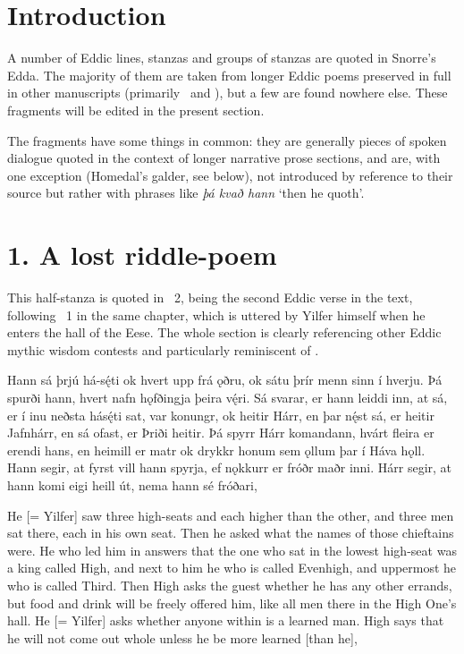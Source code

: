 
\section{Introduction}

A number of Eddic lines, stanzas and groups of stanzas are quoted in Snorre’s Edda.  The majority of them are taken from longer Eddic poems preserved in full in other manuscripts (primarily \Regius\ and \AM), but a few are found nowhere else.  These fragments will be edited in the present section.

The fragments have some things in common: they are generally pieces of spoken dialogue quoted in the context of longer narrative prose sections, and are, with one exception (Homedal’s galder, see below), not introduced by reference to their source but rather with phrases like \emph{þá kvað hann} ‘then he quoth’.

\sectionline

\section{1. A lost riddle-poem}\chapterStart

This half-stanza is quoted in \Gylfaginning\ 2, being the second Eddic verse in the text, following \Havamal\ 1 in the same chapter, which is uttered by Yilfer himself when he enters the hall of the Eese. The whole section is clearly referencing other Eddic mythic wisdom contests and particularly reminiscent of \Vafthrudnismal.

\bpg\bpa%
Hann sá þrjú há-sę́ti ok hvert upp frá ǫðru, ok sátu þrír menn sinn í hverju. Þá spurði hann, hvert nafn hǫfðingja þeira vę́ri. Sá svarar, er hann leiddi inn, at sá, er í inu neðsta hásę́ti sat, var konungr, ok heitir Hárr, en þar nę́st sá, er heitir Jafnhárr, en sá ofast, er Þriði heitir. Þá spyrr Hárr komandann, hvárt fleira er erendi hans, en heimill er matr ok drykkr honum sem ǫllum þar í Háva hǫll. Hann segir, at fyrst vill hann spyrja, ef nǫkkurr er fróðr maðr inni. Hárr segir, at hann komi eigi heill út, nema hann sé fróðari,\epa

\bpb He [= Yilfer] saw three high-seats and each higher than the other, and three men sat there, each in his own seat. Then he asked what the names of those chieftains were. He who led him in answers that the one who sat in the lowest high-seat was a king called High, and next to him he who is called Evenhigh, and uppermost he who is called Third. Then High asks the guest whether he has any other errands, but food and drink will be freely offered him, like all men there in the High One’s hall. He [= Yilfer] asks whether anyone within is a learned man.  High says that he will not come out whole unless he be more learned [than he],\epb\epg

